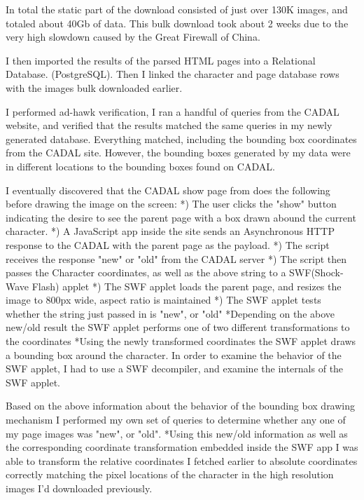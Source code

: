             In total the static part of the download consisted of just over 130K images, and totaled about 40Gb of data.  This bulk download took about 2 weeks due to the very high slowdown caused by the Great Firewall of China.
            
            I then imported the results of the parsed HTML pages into a Relational Database. (PostgreSQL).  Then I linked the character and page database rows with the images bulk downloaded earlier.
            
            I performed ad-hawk verification, I ran a handful of queries from the CADAL website, and verified that the results matched the same queries in my newly generated database.   Everything matched, including the bounding box coordinates from the CADAL site.  However, the bounding boxes generated by my data were in different locations to the bounding boxes found on CADAL.
            
            
            I eventually discovered that the CADAL show page from does the following before drawing the image on the screen:
                *) The user clicks the "show" button indicating the desire to see the parent page with a box drawn abound the current character.
                *) A JavaScript app inside the site sends an Asynchronous HTTP response to the CADAL with the parent page as the payload.
                *) The script receives the response "new" or "old" from the CADAL server
                *) The script then passes the Character coordinates, as well as the above string to a SWF(Shock-Wave Flash) applet
                *) The SWF applet loads the parent page, and resizes the image to 800px wide, aspect ratio is maintained
                *) The SWF applet tests whether the string just passed in is "new", or "old"
                    *Depending on the above new/old result the SWF applet performs one of two different transformations to the coordinates
                    *Using the newly transformed coordinates the SWF applet draws a bounding box around the character.
                In order to examine the behavior of the SWF applet, I had to use a SWF decompiler, and examine the internals of the SWF applet.
            
                Based on the above information about the behavior of the bounding box drawing mechanism I performed my own set of queries to determine whether any one of my page images was "new", or "old".
                *Using this new/old information as well as the corresponding coordinate transformation embedded inside the SWF app I was able to transform the relative coordinates I fetched earlier to absolute coordinates correctly matching the pixel locations of the character in the high resolution images I'd downloaded previously.
                
